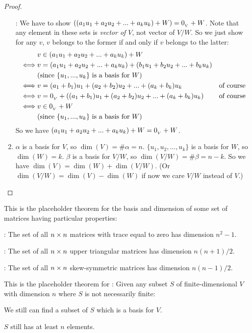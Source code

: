 \begin{proof}
\begin{enumerate}
\RED{(*)}: We have to show \(((a_1 u_1 + a_2 u_2 + ... + a_k u_k) + W) = 0_{_V} + W\).
Note that any element in these sets is \emph{vector of \(V\)}, not vector of \(V/W\).
So we just show for any \(v\), \(v\) belongs to the former if and only if \(v\) belongs to the latter:
\begin{align*}
         & v \in (a_1 u_1 + a_2 u_2 + ... + a_k u_k) + W \\
    \iff & v = (a_1 u_1 + a_2 u_2 + ... + a_k u_k) + (b_1 u_1 + b_2 u_2 + ... + b_k u_k) \\
         & \text{(since \(\{ u_1, ..., u_k \}\) is a basis for \(W\))} \\
    \iff & v = (a_1 + b_1) u_1 + (a_2 + b_2) u_2 + ... + (a_k + b_k) u_k & \text{of course} \\
    \iff & v = 0_{_V} + ((a_1 + b_1) u_1 + (a_2 + b_2) u_2 + ... + (a_k + b_k) u_k) & \text{of course} \\
    \iff & v \in 0_{_V} + W \\
         & \text{(since \(\{ u_1, ..., u_k \}\) is a basis for \(W\))} \\
\end{align*}
So we have \((a_1 u_1 + a_2 u_2 + ... + a_k u_k) + W = 0_{_V} + W\).

\item
\(\alpha\) is a basis for \(V\), so \(\dim(V) = \#\alpha = n\).
\(\{ u_1, u_2, ..., u_k \}\) is a basis for \(W\), so \(\dim(W) = k\).
\(\beta\) is a basis for \(V/W\), so \(\dim(V/W) = \#\beta = n - k\).
So we have \(\dim(V) = \dim(W) + \dim(V/W)\).
(Or \(\dim(V/W) = \dim(V) - \dim(W)\) if now we care \(V/W\) instead of \(V\).)
\end{enumerate}
\end{proof}

\begin{additional theorem} \label{athm 1.19}
This is the placeholder theorem for the basis and dimension of some set of matrices having particular properties:

 : The set of all \(n \times n\) matrices with trace equal to zero has dimension \(n^2 - 1\).

 : The set of all \(n \times n\) upper triangular matrices has dimension \(n(n + 1)/2\).

 : The set of all \(n \times n\) skew-symmetric matrices has dimension \(n(n - 1)/2\).
\end{additional theorem}

\begin{additional theorem} \label{athm 1.20}
This is the placeholder theorem for : Given any subset \(S\) of finite-dimensional \(V\) with dimension \(n\) where \(S\) is not necessarily finite:

 We still can find a subset of \(S\) which is a basis for \(V\).

 \(S\) still has at least \(n\) elements.
\end{additional theorem}

